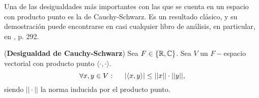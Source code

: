 Una de las desigualdades
más importantes con las que se cuenta en un espacio
con producto punto es la de Cauchy-Schwarz. Es un resultado clásico, y su 
demostración puede encontrarse en casi cualquier libro de análisis, 
en particular, en \cite{Lang}, p. 292.

\begin{teo}
(\textbf{Desigualdad de Cauchy-Schwarz}) \label{Teo:CauchySchwarz}
Sea $F \in \{ \mathbb{R}, \mathbb{C} \}$.
Sea $V$ un $F-$espacio vectorial con producto punto 
$ \langle \cdot  , \cdot  \rangle$.
\begin{equation}
\label{eq0: 12Feb}
\forall x , y \in V : \hspace{0.5cm}
|\langle x , y \rangle | \leq ||x|| \cdot ||y||,
\end{equation}
siendo $|| \cdot ||$
la norma inducida por el producto punto.
\end{teo}



